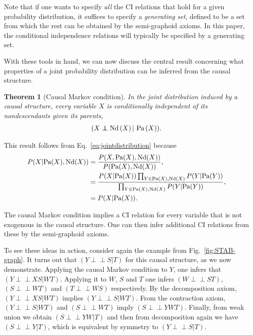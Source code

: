\documentclass[letterpaper,onecolumn,nofootinbib]{revtex4}
\newtheorem{theorem}{Theorem}
\def\indep{\perp\!\!\!\!\perp}
\begin{document}
Note that if one wants to specify \emph{all} the CI relations that hold for a given
probability distribution, it suffices to specify a \emph{generating set},
defined to be a set from which the rest can be obtained by the semi-graphoid axioms.  In this
paper, the conditional independence relations will typically be specified by
a generating set.

With these tools in hand, we can now discuss the central result concerning what properties of a joint probability distribution can be inferred from the causal structure.

\begin{theorem}[Causal Markov condition] In the joint distribution induced by
a causal structure, every variable $X$ is conditionally
independent of its nondescendants given its parents,
\begin{equation*}
(X\indep \text{\textrm{Nd}}\left( X\right) |\text{ \textrm{Pa}}\left( X\right) ).
\end{equation*}
\end{theorem}


This result follows from Eq.~\eqref{eq:jointdistribution} because
\begin{align}
P(X|\text{Pa}(X),\text{Nd}(X))
&= \frac{P(X,\text{Pa}(X),\text{Nd}(X))}{P(\text{Pa}(X),\text{Nd}(X))}, \notag  \\
&=\frac{P(X|\text{Pa}(X))\prod_{Y\in \text{Pa}(X),\text{Nd}(X)} P(Y|\text{Pa}(Y)) }
{\prod_{Y\in \text{Pa}(X),\text{Nd}(X)} P(Y|\text{Pa}(Y)) }, \notag  \\
&=P(X|\text{Pa}(X)).
\end{align}


The causal Markov condition implies a CI relation for every variable that is not exogenous in the causal structure. One can then infer additional CI relations from these by the semi-graphoid axioms.

To see these ideas in action, consider again the example from Fig.~\ref{fig:STAB-graph}.  It turns out that $(Y \indep S | T)$ for this causal structure, as we now demonstrate. Applying the causal Markov condition to $Y$, one infers that $(Y \indep XS | WT)$.  Applying it to $W$, $S$ and $T$ one infers $(W\indep ST)$, $(S\indep WT)$ and $(T \indep WS)$ respectively.  By the decomposition axiom, $(Y \indep XS | WT)$ implies $(Y \indep S | WT)$.  From the contraction axiom, $(Y \indep S | WT)$ and $(S \indep WT)$ imply $(S\indep YWT)$.  Finally, from weak union we obtain $(S\indep YW|T)$ and then from decomposition again we have $(S\indep Y|T)$, which is equivalent by symmetry to $(Y\indep S|T)$.
\end{document}

